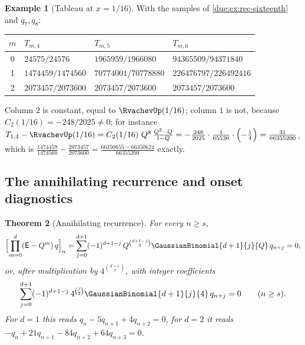 \documentclass[11pt,oneside]{article}
\theoremstyle{plain}
\newtheorem{theorem}{Theorem}[section]
\theoremstyle{definition}
\newtheorem{example}[theorem]{Example}
\theoremstyle{remark}
\newcommand{\upn}[1]{\RvachevUp_{#1}}
\newcommand{\Qq}{Q}                                         %
\newcommand{\Cr}[2]{C_{#1}\!\left(#2\right)}                %
\newcommand{\qn}[1]{q_{#1}}                                 %
\begin{document}
\begin{example}[Tableau at $x=1/16$]
\label{due:ex:rec-tableau}
With the samples of \cref{due:ex:rec-sixteenth} and $\qn{7},\qn{8}$:
\begin{center}
\begin{tabular}{c@{\qquad}l@{\qquad}l@{\qquad}l}
\toprule
$m$ & $T_{m,4}$ & $T_{m,5}$ & $T_{m,6}$\\
\midrule
0 & $24575/24576$ & $1965959/1966080$ & $94365509/94371840$\\
1 & $1474459/1474560$ & $70774001/70778880$ & $226476797/226492416$\\
2 & $2073457/2073600$ & $2073457/2073600$ & $2073457/2073600$\\
\bottomrule
\end{tabular}
\end{center}
Column $2$ is constant, equal to $\RvachevUp(1/16)$; column $1$ is not,
because $\Cr{2}{1/16}=-248/2025\ne0$; for instance
$T_{1,4}-\RvachevUp(1/16)=\Cr{2}{1/16}\,\Qq^{8}\,\frac{\Qq^{2}-\Qq}{1-\Qq}
=-\frac{248}{2025}\cdot\frac{1}{65536}\cdot\Bigl(-\frac14\Bigr)
=\frac{31}{66355200}$, which is $\frac{1474459}{1474560}-\frac{2073457}{2073600}
=\frac{66350655-66350624}{66355200}$ exactly.
\end{example}

\subsection{The annihilating recurrence and onset diagnostics}

\begin{theorem}[Annihilating recurrence]
\label{due:thm:rec-recurrence}
For every $n\ge s$,
\begin{equation}
 \Bigl[\prod_{m=0}^{d}(\mathsf E-\Qq^{m})\,q\Bigr]_{n}
 =\sum_{j=0}^{d+1}(-1)^{d+1-j}\,\Qq^{\binom{d+1-j}{2}}
 \GaussianBinomial{d+1}{j}{\Qq}\,\qn{n+j}=0,
 \label{due:eq:rec-recurrence}
\end{equation}
or, after multiplication by $4^{\binom{d+1}{2}}$, with integer coefficients
\begin{equation}
 \sum_{j=0}^{d+1}(-1)^{d+1-j}\,4^{\binom{j}{2}}\GaussianBinomial{d+1}{j}{4}\,\qn{n+j}=0
 \qquad(n\ge s).
 \label{due:eq:rec-recurrence-int}
\end{equation}
For $d=1$ this reads $\qn{n}-5\qn{n+1}+4\qn{n+2}=0$, for $d=2$ it reads
$-\qn{n}+21\qn{n+1}-84\qn{n+2}+64\qn{n+3}=0$.
\end{theorem}
\end{document}
